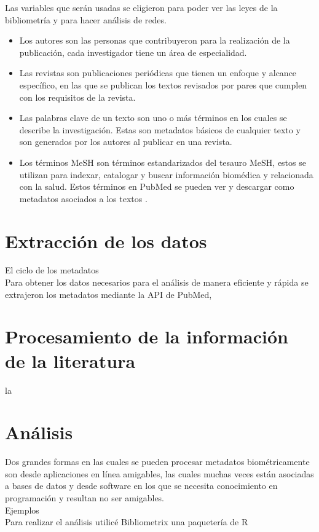 \documentclass[../Main.tex]{subfiles}
\begin{document}
Las variables que serán usadas se eligieron para poder ver las leyes de la bibliometría y para hacer análisis de redes.
\begin{itemize}
    \item Los autores son las personas que contribuyeron para la realización de la publicación, cada investigador tiene un área de especialidad.
    \item Las revistas son  publicaciones periódicas que tienen un enfoque y alcance específico, en las que se publican los textos revisados por pares que cumplen con los requisitos de la revista. 
    \item Las palabras clave de un texto son uno o más términos en los cuales se describe la investigación. Estas son metadatos básicos de cualquier texto y son generados por los autores al publicar en una revista.  
    \item Los términos MeSH son términos estandarizados del tesauro MeSH, estos se utilizan para indexar, catalogar y buscar información biomédica y relacionada con la salud. Estos términos en PubMed se pueden ver y descargar como metadatos asociados a los textos \parencite{noauthor_medical_2023}.
\end{itemize}

\section{Extracción de los datos}
\noindent
El ciclo de los metadatos\\
Para obtener los datos necesarios para el análisis de manera eficiente y rápida se extrajeron los metadatos mediante la API de PubMed, 
\section{Procesamiento de la información de la literatura}
\noindent
la
\section{Análisis}
\noindent
Dos grandes formas en las cuales se pueden procesar metadatos biométricamente son desde aplicaciones en línea amigables, las cuales muchas veces están asociadas a bases de datos y desde software en los que se necesita conocimiento en programación y resultan no ser amigables.\\
Ejemplos\\
Para realizar el análisis utilicé Bibliometrix una paquetería de R \parencite{bibliometrix}
\end{document}
